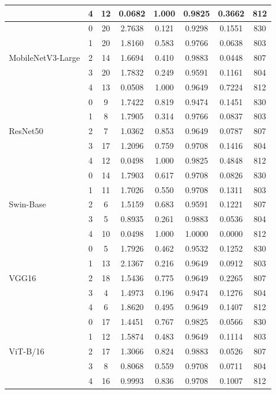 \documentclass[11pt]{article}
\begin{document}
\begin{table}[htbp]
\begin{tabular*}{\textwidth}{@{\extracolsep{\fill}}lccccccc@{}}
 & 4 & 12 & 0.0682 & 1.000 & 0.9825 & 0.3662 & 812 \\
\midrule
\multirow{5}{*}{MobileNetV3-Large} & 0 & 20 & 2.7638 & 0.121 & 0.9298 & 0.1551 & 830 \\
 & 1 & 20 & 1.8160 & 0.583 & 0.9766 & 0.0638 & 803 \\
 & 2 & 14 & 1.6694 & 0.410 & 0.9883 & 0.0448 & 807 \\
 & 3 & 20 & 1.7832 & 0.249 & 0.9591 & 0.1161 & 804 \\
 & 4 & 13 & 0.0508 & 1.000 & 0.9649 & 0.7224 & 812 \\
\midrule
\multirow{5}{*}{ResNet50} & 0 & 9 & 1.7422 & 0.819 & 0.9474 & 0.1451 & 830 \\
 & 1 & 8 & 1.7905 & 0.314 & 0.9766 & 0.0837 & 803 \\
 & 2 & 7 & 1.0362 & 0.853 & 0.9649 & 0.0787 & 807 \\
 & 3 & 17 & 1.2096 & 0.759 & 0.9708 & 0.1416 & 804 \\
 & 4 & 12 & 0.0498 & 1.000 & 0.9825 & 0.4848 & 812 \\
\midrule
\multirow{5}{*}{Swin-Base} & 0 & 14 & 1.7903 & 0.617 & 0.9708 & 0.0826 & 830 \\
 & 1 & 11 & 1.7026 & 0.550 & 0.9708 & 0.1311 & 803 \\
 & 2 & 6 & 1.5159 & 0.683 & 0.9591 & 0.1221 & 807 \\
 & 3 & 5 & 0.8935 & 0.261 & 0.9883 & 0.0536 & 804 \\
 & 4 & 10 & 0.0498 & 1.000 & 1.0000 & 0.0000 & 812 \\
\midrule
\multirow{5}{*}{VGG16} & 0 & 5 & 1.7926 & 0.462 & 0.9532 & 0.1252 & 830 \\
 & 1 & 13 & 2.1367 & 0.216 & 0.9649 & 0.0912 & 803 \\
 & 2 & 18 & 1.5436 & 0.775 & 0.9649 & 0.2265 & 807 \\
 & 3 & 4 & 1.4973 & 0.196 & 0.9474 & 0.1276 & 804 \\
 & 4 & 6 & 1.8620 & 0.495 & 0.9649 & 0.1407 & 812 \\
\midrule
\multirow{5}{*}{ViT-B/16} & 0 & 17 & 1.4451 & 0.767 & 0.9825 & 0.0566 & 830 \\
 & 1 & 12 & 1.5874 & 0.483 & 0.9649 & 0.1114 & 803 \\
 & 2 & 17 & 1.3066 & 0.824 & 0.9883 & 0.0526 & 807 \\
 & 3 & 8 & 0.8068 & 0.559 & 0.9708 & 0.0711 & 804 \\
 & 4 & 16 & 0.9993 & 0.836 & 0.9708 & 0.1007 & 812 \\
\bottomrule
\end{tabular*}
\end{table}
\end{document}
